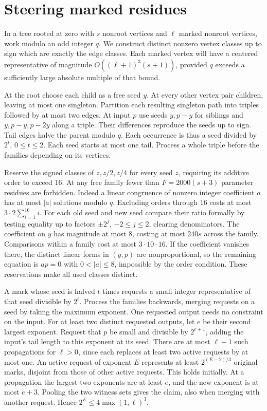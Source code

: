 \section{Steering marked residues}
In a tree rooted at zero with $s$ nonroot vertices and $\ell$ marked
nonroot vertices, work modulo an odd integer $q$. We construct distinct
nonzero vertex classes up to sign which are exactly the edge classes.
Each marked vertex will have a centered representative of magnitude
$O((\ell+1)^3(s+1))$, provided $q$ exceeds a sufficiently large absolute
multiple of that bound.

At the root choose each child as a free seed $y$. At every other vertex
pair children, leaving at most one singleton. Partition each resulting
singleton path into triples followed by at most two edges. At input $p$
use seeds $y,p-y$ for siblings and $y,p-y,p-2y$ along a triple. Their
differences reproduce the seeds up to sign. Tail edges halve the parent
modulo $q$. Each occurrence is thus a seed divided by $2^t$, $0\le t\le2$.
Each seed starts at most one tail. Process a whole triple before the
families depending on its vertices.

Reserve the signed classes of $z,z/2,z/4$ for every seed $z$, requiring
its additive order to exceed 16. At any free family fewer than
$F=2000(s+3)$ parameter residues are forbidden. Indeed a linear
congruence of nonzero integer coefficient $a$ has at most $|a|$
solutions modulo $q$. Excluding orders through 16 costs at most
$3\cdot2\sum_{i=1}^{16}i$. For each old seed and new seed compare their
ratio formally by testing equality up to factors $\pm 2^j$,
$-2\le j\le2$, clearing denominators. The coefficient on $y$ has
magnitude at most 8, costing at most $240s$ across the family.
Comparisons within a family cost at most $3\cdot10\cdot16$.
If the coefficient vanishes there, the distinct linear forms in $(y,p)$
are nonproportional, so the remaining equation is $ap=0$ with
$0<|a|\le8$, impossible by the order condition. These reservations
make all used classes distinct.

A mark whose seed is halved $t$ times requests a small integer
representative of that seed divisible by $2^t$. Process the families
backwards, merging requests on a seed by taking the maximum exponent.
One requested output needs no constraint on the input. For at least
two distinct requested outputs, let $e$ be their second largest
exponent. Request that $p$ be small and divisible by $2^{e+1}$,
adding the input's tail length to this exponent at its seed.
There are at most $\ell-1$ such propagations for $\ell>0$, since each
replaces at least two active requests by at most one. An active request
of exponent $E$ represents at least $2^{(E-2)/3}$ original marks,
disjoint from those of other active requests. This holds initially.
At a propagation the largest two exponents are at least $e$, and the
new exponent is at most $e+3$. Pooling the two witness sets gives the
claim, also when merging with another request. Hence $2^E\le
4\max(1,\ell)^3$.

